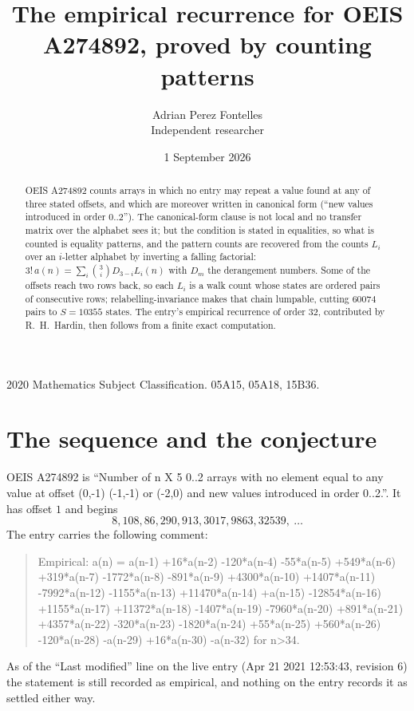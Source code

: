 \documentclass[11pt,a4paper]{article}
\title{The empirical recurrence for OEIS A274892, proved by counting patterns}
\author{Adrian Perez Fontelles\\ \small Independent researcher}
\date{1 September 2026}
\theoremstyle{plain}
\theoremstyle{definition}
\begin{document}
\maketitle

\begin{abstract}
OEIS A274892 counts arrays in which no entry may repeat a value found at any of three stated
offsets, and which are moreover written in canonical form (``new values introduced in order
$0..2$''). The canonical-form clause is not local and no transfer matrix over the
alphabet sees it; but the condition is stated in equalities, so what is counted is equality
patterns, and the pattern counts are recovered from the counts $L_i$ over an $i$-letter
alphabet by inverting a falling factorial:
$3!\,a(n)=\sum_i\binom{3}{i}D_{3-i}L_i(n)$ with $D_m$ the derangement numbers.
Some of the offsets reach two rows back, so each $L_i$ is a walk count whose states are
ordered pairs of consecutive rows; relabelling-invariance makes that chain lumpable,
cutting $60074$ pairs to $S=10355$ states. The entry's empirical recurrence of order $32$,
contributed by R.~H.~Hardin, then follows from a finite exact computation.
\end{abstract}

\noindent\small 2020 Mathematics Subject Classification. 05A15, 05A18, 15B36.\normalsize

\section{The sequence and the conjecture}

OEIS A274892 is ``Number of n X 5 0..2 arrays with no element equal to any value at offset (0,-1) (-1,-1) or (-2,0) and new values introduced in order 0..2.''. It has offset $1$ and begins
\[
8, 108, 86, 290, 913, 3017, 9863, 32539,\ \dots
\]
The entry carries the following comment:
\begin{quote}\small
Empirical: a(n) = a(n-1) +16*a(n-2) -120*a(n-4) -55*a(n-5) +549*a(n-6) +319*a(n-7) -1772*a(n-8) -891*a(n-9) +4300*a(n-10) +1407*a(n-11) -7992*a(n-12) -1155*a(n-13) +11470*a(n-14) +a(n-15) -12854*a(n-16) +1155*a(n-17) +11372*a(n-18) -1407*a(n-19) -7960*a(n-20) +891*a(n-21) +4357*a(n-22) -320*a(n-23) -1820*a(n-24) +55*a(n-25) +560*a(n-26) -120*a(n-28) -a(n-29) +16*a(n-30) -a(n-32) for n>34.
\end{quote}
As of the ``Last modified'' line on the live entry (Apr 21 2021 12:53:43, revision 6) the statement is
still recorded as empirical, and nothing on the entry records it as settled either way.
\end{document}
